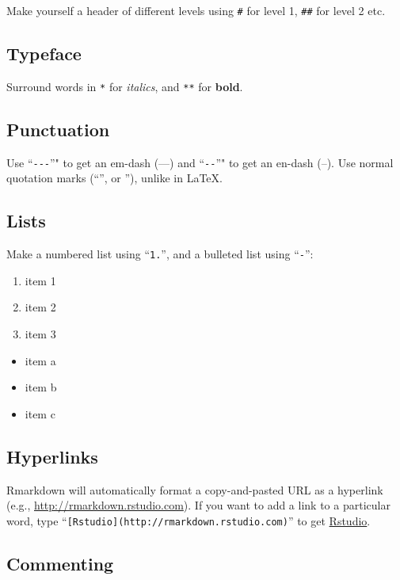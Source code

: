 \documentclass[11pt,]{article}
\providecommand{\tightlist}{%
  \setlength{\itemsep}{0pt}\setlength{\parskip}{0pt}}
\begin{document}
Make yourself a header of different levels using \texttt{\#} for level
1, \texttt{\#\#} for level 2 etc.

\subsection{Typeface}\label{typeface}

Surround words in \texttt{*} for \emph{italics}, and \texttt{**} for
\textbf{bold}.

\subsection{Punctuation}\label{punctuation}

Use ``\texttt{-\/-\/-}''" to get an em-dash (---) and ``\texttt{-\/-}''"
to get an en-dash (--). Use normal quotation marks (``'', or ''), unlike
in \LaTeX.

\subsection{Lists}\label{lists}

Make a numbered list using ``\texttt{1.}'', and a bulleted list using
``\texttt{-}'':

\begin{enumerate}
\def\labelenumi{\arabic{enumi}.}
\tightlist
\item
  item 1
\item
  item 2
\item
  item 3
\end{enumerate}

\begin{itemize}
\tightlist
\item
  item a
\item
  item b
\item
  item c
\end{itemize}

\subsection{Hyperlinks}\label{hyperlinks}

Rmarkdown will automatically format a copy-and-pasted URL as a hyperlink
(e.g., \url{http://rmarkdown.rstudio.com}). If you want to add a link to
a particular word, type
``\texttt{{[}Rstudio{]}(http://rmarkdown.rstudio.com)}'' to get
\href{http://rmarkdown.rstudio.com}{Rstudio}.

\subsection{Commenting}\label{commenting}
\end{document}

